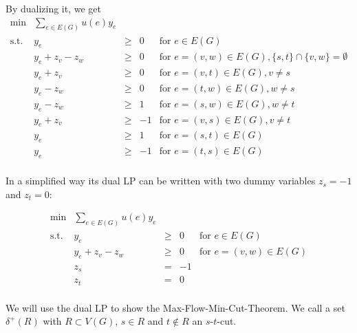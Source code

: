 \documentclass[12pt, showidx, twoside]{article}
\def\R{\mathbb{R}}
\begin{document}
{{{By dualizing it, we get
\begin{equation}\label{eq::maximum_flow_dual_lp_complete}
\begin{array}{lrrll}
 \min    &        \sum\limits_{e \in E(G)} u(e)y_e  & &\\
\text{s.t.}   & y_e             & \geq &  0       & \mbox{for } e \in E(G)\\
              & y_e + z_v - z_w & \geq &  0       & \mbox{for } e=(v,w) \in E(G), \{s,t\} \cap \{v,w\} = \emptyset\\
              & y_e + z_v       & \geq &  0       & \mbox{for } e=(v,t) \in E(G), v \neq s\\
              & y_e - z_w       & \geq &  0       & \mbox{for } e=(t,w) \in E(G), w \neq s\\
              & y_e - z_w       & \geq &  1       & \mbox{for } e=(s,w) \in E(G), w \neq t\\
              & y_e + z_v       & \geq & -1       & \mbox{for } e=(v,s) \in E(G), v \neq t\\
              & y_e             & \geq & 1       & \mbox{for } e=(s,t) \in E(G)\\
              & y_e             & \geq & -1      & \mbox{for } e=(t,s) \in E(G)\\
\end{array}
\end{equation}

In a simplified way its dual LP can be written with two dummy variables
$z_s = -1$ and $z_t = 0$:

\begin{equation}\label{eq::maximum_flow_dual_lp}
\begin{array}{lrcll}
 \min    &        \sum\limits_{e \in E(G)} u(e)y_e  & &\\
\text{s.t.}   & y_e             & \geq &  0       & \mbox{for } e \in E(G)\\
              & y_e + z_v - z_w & \geq &  0       & \mbox{for } e=(v,w) \in E(G)\\
              & z_s             &  =  &  -1      &\\
              & z_t             &  =  &   0      &\\
\end{array}
\end{equation}






We will use the dual LP to show the Max-Flow-Min-Cut-Theorem.
We call a set $\delta^+(R)$ with $R \subset V(G)$, 
$s \in R$ and $t \not \in R$ 
an $s$-$t$-cut.{}


}}}
\end{document}
